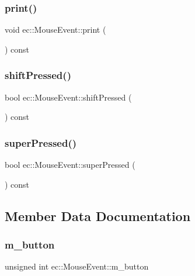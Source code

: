 \subsubsection{\texorpdfstring{print()}{print()}}
{\footnotesize\ttfamily void ec\+::\+Mouse\+Event\+::print (\begin{DoxyParamCaption}{ }\end{DoxyParamCaption}) const}

\mbox{\label{structec_1_1_mouse_event_aa5ceeabab4134dbabebf8e9e9822c47f}} 
\subsubsection{\texorpdfstring{shift\+Pressed()}{shiftPressed()}}
{\footnotesize\ttfamily bool ec\+::\+Mouse\+Event\+::shift\+Pressed (\begin{DoxyParamCaption}{ }\end{DoxyParamCaption}) const}

\mbox{\label{structec_1_1_mouse_event_ae3d285f4dbea2e76cd0f90f814920292}} 
\subsubsection{\texorpdfstring{super\+Pressed()}{superPressed()}}
{\footnotesize\ttfamily bool ec\+::\+Mouse\+Event\+::super\+Pressed (\begin{DoxyParamCaption}{ }\end{DoxyParamCaption}) const}



\subsection{Member Data Documentation}
\mbox{\label{structec_1_1_mouse_event_a094f93fb232556fd71f8351ffe03efb4}} 
\subsubsection{\texorpdfstring{m\+\_\+button}{m\_button}}
{\footnotesize\ttfamily unsigned int ec\+::\+Mouse\+Event\+::m\+\_\+button}

